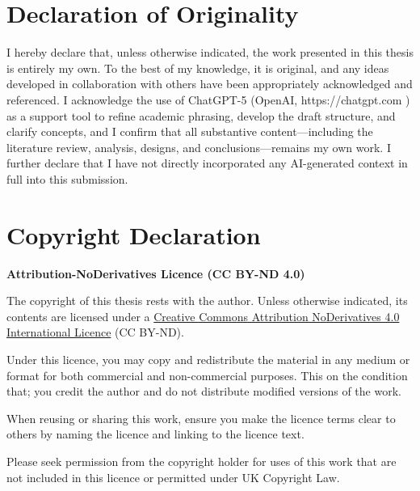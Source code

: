 \cleardoublepage{}
{}\mtcaddchapter 
\chapter*{Declaration of Originality}
\addtocounter{counter}{-1}




I hereby declare that, unless otherwise indicated, the work presented in this thesis is entirely my own. To the best of my knowledge, it is original, and any ideas developed in collaboration with others have been appropriately acknowledged and referenced. I acknowledge the use of ChatGPT-5 (OpenAI, https://chatgpt.com
) as a support tool to refine academic phrasing, develop the draft structure, and clarify concepts, and I confirm that all substantive content—including the literature review, analysis, designs, and conclusions—remains my own work. I further declare that I have not directly incorporated any AI-generated context in full into this submission.


\cleardoublepage{}
{}\mtcaddchapter 
\chapter*{Copyright Declaration}
\addtocounter{counter}{-1}




\textbf{Attribution-NoDerivatives Licence (CC BY-ND 4.0)}

The copyright of this thesis rests with the author. Unless otherwise indicated, its contents are licensed under a \href{https://creativecommons.org/licenses/by-nd/4.0/}{Creative Commons Attribution NoDerivatives 4.0 International Licence}  (CC BY-ND).

Under this licence, you may copy and redistribute the material in any medium or format for both commercial and non-commercial purposes.  This on the condition that; you credit the author and do not distribute modified versions of the work.

When reusing or sharing this work, ensure you make the licence terms clear to others by naming the licence and linking to the licence text.

Please seek permission from the copyright holder for uses of this work that are not included in this licence or permitted under UK Copyright Law.
